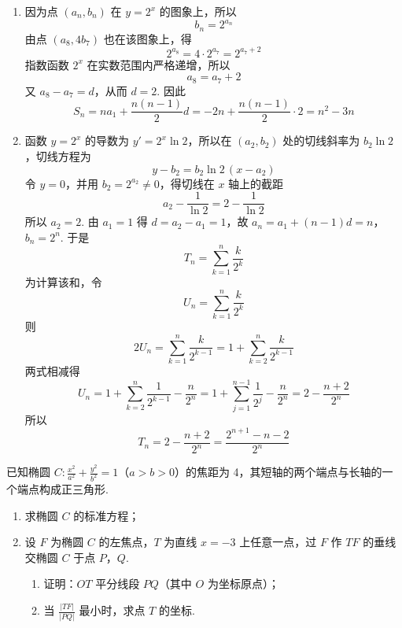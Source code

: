 \begin{solution}
\begin{enumerate}
\item 因为点 \((a_n,b_n)\) 在 \(y=2^x\) 的图象上，所以
\[
b_n=2^{a_n}
\]
由点 \((a_8,4b_7)\) 也在该图象上，得
\[
2^{a_8}=4\cdot2^{a_7}=2^{a_7+2}
\]
指数函数 \(2^x\) 在实数范围内严格递增，所以
\[
a_8=a_7+2
\]
又 \(a_8-a_7=d\)，从而 \(d=2\). 因此
\[
S_n=na_1+\frac{n(n-1)}2d
=-2n+\frac{n(n-1)}2\cdot2
=n^2-3n
\]

\item 函数 \(y=2^x\) 的导数为 \(y'=2^x\ln2\)，所以在 \((a_2,b_2)\) 处的切线斜率为 \(b_2\ln2\)，切线方程为
\[
y-b_2=b_2\ln2\,(x-a_2)
\]
令 \(y=0\)，并用 \(b_2=2^{a_2}\ne0\)，得切线在 \(x\) 轴上的截距
\[
a_2-\frac1{\ln2}=2-\frac1{\ln2}
\]
所以 \(a_2=2\). 由 \(a_1=1\) 得 \(d=a_2-a_1=1\)，故
\(a_n=a_1+(n-1)d=n\)，\(b_n=2^n\).
于是
\[
T_n=\sum_{k=1}^n\frac{k}{2^k}
\]
为计算该和，令
\[
U_n=\sum_{k=1}^n\frac{k}{2^k}
\]
则
\[
2U_n=\sum_{k=1}^n\frac{k}{2^{k-1}}
=1+\sum_{k=2}^n\frac{k}{2^{k-1}}
\]
两式相减得
\[
U_n=1+\sum_{k=2}^n\frac1{2^{k-1}}-\frac{n}{2^n}
=1+\sum_{j=1}^{n-1}\frac1{2^j}-\frac{n}{2^n}
=2-\frac{n+2}{2^n}
\]
所以
\[
T_n=2-\frac{n+2}{2^n}
=\frac{2^{n+1}-n-2}{2^n}
\]
\end{enumerate}
\end{solution}

\begin{problem}
已知椭圆 \(C: \frac{x^2}{a^2} + \frac{y^2}{b^2} = 1\)（\(a > b > 0\)）的焦距为 4，其短轴的两个端点与长轴的一个端点构成正三角形.
\begin{enumerate}
\item 求椭圆 \(C\) 的标准方程；
\item 设 \(F\) 为椭圆 \(C\) 的左焦点，\(T\) 为直线 \(x = -3\) 上任意一点，过 \(F\) 作 \(TF\) 的垂线交椭圆 \(C\) 于点 \(P\)，\(Q\).
\begin{enumerate}
\item 证明：\(OT\) 平分线段 \(PQ\)（其中 \(O\) 为坐标原点）；
\item 当 \(\frac{|TF|}{|PQ|}\) 最小时，求点 \(T\) 的坐标.
\end{enumerate}
\end{enumerate}
\end{problem}

